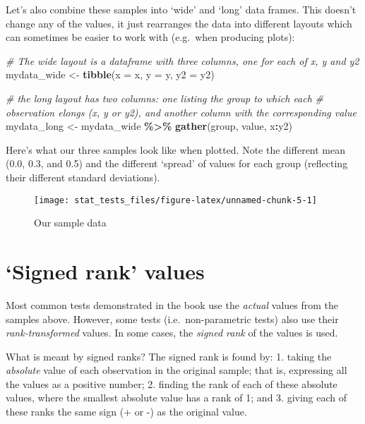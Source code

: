 \documentclass[
  12pt,
]{krantz}
\newenvironment{Shaded}{\begin{snugshade}}{\end{snugshade}}
\newcommand{\CommentTok}[1]{\textcolor[rgb]{0.56,0.35,0.01}{\textit{#1}}}
\newcommand{\DataTypeTok}[1]{\textcolor[rgb]{0.13,0.29,0.53}{#1}}
\newcommand{\KeywordTok}[1]{\textcolor[rgb]{0.13,0.29,0.53}{\textbf{#1}}}
\newcommand{\NormalTok}[1]{#1}
\newcommand{\OperatorTok}[1]{\textcolor[rgb]{0.81,0.36,0.00}{\textbf{#1}}}
\newcommand{\StringTok}[1]{\textcolor[rgb]{0.31,0.60,0.02}{#1}}
\begin{document}
Let's also combine these samples into `wide' and `long' data frames. This doesn't change any of the values, it just rearranges the data into different layouts which can sometimes be easier to work with (e.g.~when producing plots):

\begin{Shaded}
\begin{Highlighting}[]
\CommentTok{\# The wide layout is a dataframe with three columns, one for each of x, y and y2}
\NormalTok{mydata\_wide \textless{}{-}}\StringTok{ }\KeywordTok{tibble}\NormalTok{(}\DataTypeTok{x =}\NormalTok{ x, }\DataTypeTok{y =}\NormalTok{ y, }\DataTypeTok{y2 =}\NormalTok{ y2)}

\CommentTok{\# the long layout has two columns: one listing the group to which each}
\CommentTok{\# observation elongs (x, y or y2), and another column with the corresponding value}
\NormalTok{mydata\_long \textless{}{-}}\StringTok{ }\NormalTok{mydata\_wide }\OperatorTok{\%\textgreater{}\%}
\StringTok{  }\KeywordTok{gather}\NormalTok{(group, value, x}\OperatorTok{:}\NormalTok{y2)}
\end{Highlighting}
\end{Shaded}

Here's what our three samples look like when plotted. Note the different mean (0.0, 0.3, and 0.5) and the different `spread' of values for each group (reflecting their different standard deviations).

\begin{figure}

{\centering \texttt{[image: stat\_tests\_files/figure-latex/unnamed-chunk-5-1]} 

}

\caption{Our sample data}\label{fig:unnamed-chunk-5}
\end{figure}

\hypertarget{ranktrans}{%
\section{`Signed rank' values}\label{ranktrans}}

Most common tests demonstrated in the book use the \emph{actual} values from the samples above. However, some tests (i.e.~non-parametric tests) also use their \emph{rank-transformed} values. In some cases, the \emph{signed rank} of the values is used.

What is meant by signed ranks? The signed rank is found by:
1. taking the \emph{absolute} value of each observation in the original sample; that is, expressing all the values as a positive number;
2. finding the rank of each of these absolute values, where the smallest absolute value has a rank of 1; and
3. giving each of these ranks the same sign (+ or -) as the original value.
\end{document}
